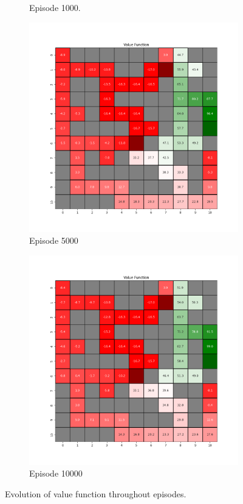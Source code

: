 \documentclass{assignment}
\begin{document}
\begin{figure}[H]
\begin{subfigure}{0.3\textwidth}
    \caption{Episode 1000.}
    \end{subfigure}\hfill
    \begin{subfigure}{0.3\textwidth}
        \includegraphics[width=\textwidth]{figures/value_q/alpha_sweep/value_function_alpha_0.1_gamma_0.95_epsilon_0.2_iteration_5000.png}
    \caption{Episode 5000}
    \end{subfigure}\hfill
    \begin{subfigure}{0.3\textwidth}
        \includegraphics[width=\textwidth]{figures/value_q/alpha_sweep/value_function_alpha_0.1_gamma_0.95_epsilon_0.2_iteration_10000.png}
    \caption{Episode 10000}
    \end{subfigure}
    \caption{Evolution of value function throughout episodes.}
    \label{fig:alpha_0.1_q_learning_value}
\end{figure}
\end{document}
